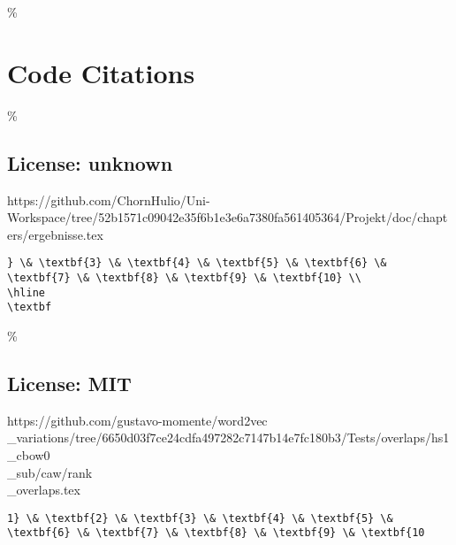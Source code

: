 \hypertarget{code-citations}{\%
\section{Code Citations}\label{code-citations}}

\hypertarget{license-unknown}{\%
\subsection{License: unknown}\label{license-unknown}}

https://github.com/ChornHulio/Uni-Workspace/tree/52b1571c09042e35f6b1e3e6a7380fa561405364/Projekt/doc/chapters/ergebnisse.tex

\begin{verbatim}
} \& \textbf{3} \& \textbf{4} \& \textbf{5} \& \textbf{6} \& \textbf{7} \& \textbf{8} \& \textbf{9} \& \textbf{10} \\
\hline
\textbf
\end{verbatim}

\hypertarget{license-mit}{\%
\subsection{License: MIT}\label{license-mit}}

https://github.com/gustavo-momente/word2vec\\_variations/tree/6650d03f7ce24cdfa497282c7147b14e7fc180b3/Tests/overlaps/hs1\\_cbow0\\_sub/caw/rank\\_overlaps.tex

\begin{verbatim}
1} \& \textbf{2} \& \textbf{3} \& \textbf{4} \& \textbf{5} \& \textbf{6} \& \textbf{7} \& \textbf{8} \& \textbf{9} \& \textbf{10
\end{verbatim}
